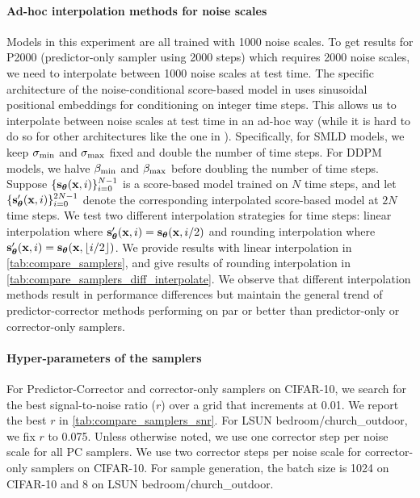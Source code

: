 \paragraph{Ad-hoc interpolation methods for noise scales} 
Models in this experiment are all trained with 1000 noise scales. To get results for P2000 (predictor-only sampler using 2000 steps) which requires 2000 noise scales, we need to interpolate between 1000 noise scales at test time. The specific architecture of the noise-conditional score-based model in \citet{ho2020denoising} uses sinusoidal positional embeddings for conditioning on integer time steps. This allows us to interpolate between noise scales at test time in an ad-hoc way (while it is hard to do so for other architectures like the one in \citet{song2019generative}). Specifically, for SMLD models, we keep $\sigma_{\text{min}}$ and $\sigma_{\text{max}}$ fixed and double the number of time steps. For DDPM models, we halve $\beta_{\text{min}}$ and $\beta_{\text{max}}$ before doubling the number of time steps. Suppose $\{\mathbf{s}_{\boldsymbol{\theta}}(\mathbf{x}, i)\}_{i=0}^{N-1}$ is a score-based model trained on $N$ time steps, and let $\{\mathbf{s}_{\boldsymbol{\theta}}'(\mathbf{x}, i)\}_{i=0}^{2N-1}$ denote the corresponding interpolated score-based model at $2N$ time steps. We test two different interpolation strategies for time steps: linear interpolation where $\mathbf{s}_{\boldsymbol{\theta}}'(\mathbf{x}, i) = \mathbf{s}_{\boldsymbol{\theta}}(\mathbf{x}, i / 2)$ and rounding interpolation where $\mathbf{s}_{\boldsymbol{\theta}}'(\mathbf{x}, i) = \mathbf{s}_{\boldsymbol{\theta}}(\mathbf{x}, \lfloor i/2 \rfloor)$. We provide results with linear interpolation in \cref{tab:compare_samplers}, and give results of rounding interpolation in \cref{tab:compare_samplers_diff_interpolate}. We observe that different interpolation methods result in performance differences but maintain the general trend of predictor-corrector methods performing on par or better than predictor-only or corrector-only samplers.

\paragraph{Hyper-parameters of the samplers}
For Predictor-Corrector and corrector-only samplers on CIFAR-10, we search for the best signal-to-noise ratio ($r$) over a grid that increments at 0.01. We report the best $r$ in \cref{tab:compare_samplers_snr}. For LSUN bedroom/church\_outdoor, we fix $r$ to 0.075. Unless otherwise noted, we use one corrector step per noise scale for all PC samplers. We use two corrector steps per noise scale for corrector-only samplers on CIFAR-10. For sample generation, the batch size is 1024 on CIFAR-10 and 8 on LSUN bedroom/church\_outdoor. 

